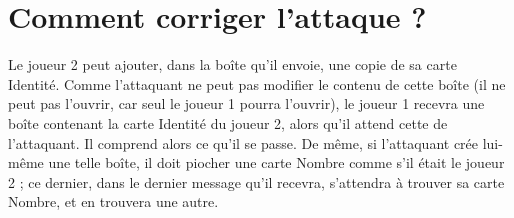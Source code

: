 \documentclass[a4paper,10pt]{article}
\begin{document}
\section{Comment corriger l'attaque ?}
Le joueur 2 peut ajouter, dans la boîte qu'il envoie, une copie de sa carte Identité. Comme l'attaquant ne peut pas modifier le contenu de cette boîte (il ne peut pas l'ouvrir, car seul le joueur 1 pourra l'ouvrir), le joueur 1 recevra une boîte contenant la carte Identité du joueur 2, alors qu'il attend cette de l'attaquant. Il comprend alors ce qu'il se passe. De même, si l'attaquant crée lui-même une telle boîte, il doit piocher une carte Nombre comme s'il était le joueur 2 ; ce dernier, dans le dernier message qu'il recevra, s'attendra à trouver sa carte Nombre, et en trouvera une autre.
\end{document}

